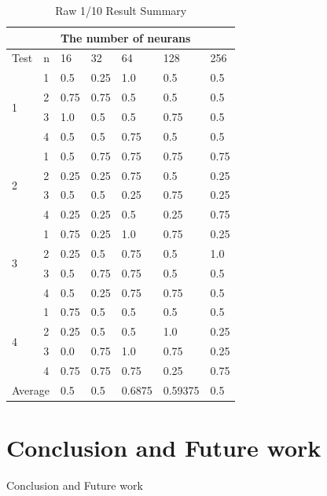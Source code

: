 \documentclass[12pt]{article}
\begin{document}
\begin{table}[H]
\centering
\begin{tabular}{|l|l|l|l|l|l|l|}
\hline
                       &      & \multicolumn{5}{l|}{The number of neurans} \\ \hline
Test                   & n    & 16    & 32    & 64      & 128      & 256   \\ \hline
\multirow{4}{*}{1}     & 1    & 0.5   & 0.25  & 1.0     & 0.5      & 0.5   \\ \cline{2-7} 
                       & 2    & 0.75  & 0.75  & 0.5     & 0.5      & 0.5   \\ \cline{2-7} 
                       & 3    & 1.0   & 0.5   & 0.5     & 0.75     & 0.5   \\ \cline{2-7} 
                       & 4    & 0.5   & 0.5   & 0.75    & 0.5      & 0.5   \\ \hline
\multirow{4}{*}{2}     & 1    & 0.5   & 0.75  & 0.75    & 0.75     & 0.75  \\ \cline{2-7} 
                       & 2    & 0.25  & 0.25  & 0.75    & 0.5      & 0.25  \\ \cline{2-7} 
                       & 3    & 0.5   & 0.5   & 0.25    & 0.75     & 0.25  \\ \cline{2-7} 
                       & 4    & 0.25  & 0.25  & 0.5     & 0.25     & 0.75  \\ \hline
\multirow{4}{*}{3}     & 1    & 0.75  & 0.25  & 1.0     & 0.75     & 0.25  \\ \cline{2-7} 
                       & 2    & 0.25  & 0.5   & 0.75    & 0.5      & 1.0   \\ \cline{2-7} 
                       & 3    & 0.5   & 0.75  & 0.75    & 0.5      & 0.5   \\ \cline{2-7} 
                       & 4    & 0.5   & 0.25  & 0.75    & 0.75     & 0.5   \\ \hline
\multirow{4}{*}{4}     & 1    & 0.75  & 0.5   & 0.5     & 0.5      & 0.5   \\ \cline{2-7} 
                       & 2    & 0.25  & 0.5   & 0.5     & 1.0      & 0.25  \\ \cline{2-7} 
                       & 3    & 0.0   & 0.75  & 1.0     & 0.75     & 0.25  \\ \cline{2-7} 
                       & 4    & 0.75  & 0.75  & 0.75    & 0.25     & 0.75  \\ \hline
\multicolumn{2}{|l|}{Average} & 0.5   & 0.5   & 0.6875  & 0.59375  & 0.5   \\ \hline
\end{tabular}
\caption{Raw 1/10 Result Summary}
\label{Raw 1/10 Result Summary}
\end{table}


\section{Conclusion and Future work}
Conclusion and Future work\\




\end{document}
